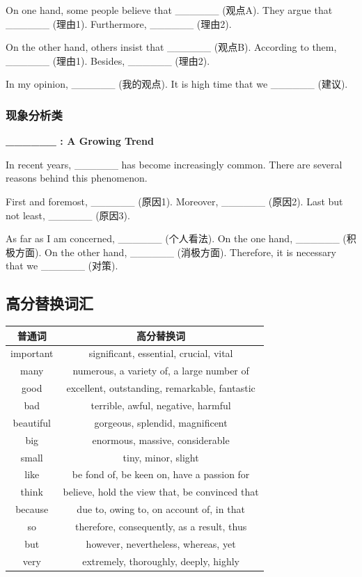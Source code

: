 On one hand, some people believe that \_\_\_\_\_\_ (观点A). They argue that \_\_\_\_\_\_ (理由1). Furthermore, \_\_\_\_\_\_ (理由2).

On the other hand, others insist that \_\_\_\_\_\_ (观点B). According to them, \_\_\_\_\_\_ (理由1). Besides, \_\_\_\_\_\_ (理由2).

In my opinion, \_\_\_\_\_\_ (我的观点). It is high time that we \_\_\_\_\_\_ (建议).

\subsubsection{现象分析类}

\begin{center}
\textbf{\_\_\_\_\_\_ : A Growing Trend}
\end{center}

In recent years, \_\_\_\_\_\_ has become increasingly common. There are several reasons behind this phenomenon.

First and foremost, \_\_\_\_\_\_ (原因1). Moreover, \_\_\_\_\_\_ (原因2). Last but not least, \_\_\_\_\_\_ (原因3).

As far as I am concerned, \_\_\_\_\_\_ (个人看法). On the one hand, \_\_\_\_\_\_ (积极方面). On the other hand, \_\_\_\_\_\_ (消极方面). Therefore, it is necessary that we \_\_\_\_\_\_ (对策).

\subsection{高分替换词汇}

\begin{center}
\begin{tabular}{c|c}
\textbf{普通词} & \textbf{高分替换词} \\ \toprule
important & significant, essential, crucial, vital \\
many & numerous, a variety of, a large number of \\
good & excellent, outstanding, remarkable, fantastic \\
bad & terrible, awful, negative, harmful \\
beautiful & gorgeous, splendid, magnificent \\
big & enormous, massive, considerable \\
small & tiny, minor, slight \\
like & be fond of, be keen on, have a passion for \\
think & believe, hold the view that, be convinced that \\
because & due to, owing to, on account of, in that \\
so & therefore, consequently, as a result, thus \\
but & however, nevertheless, whereas, yet \\
very & extremely, thoroughly, deeply, highly \\
\bottomrule
\end{tabular}
\end{center}

